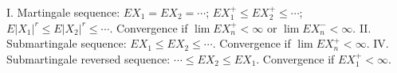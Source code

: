 I. Martingale sequence: $EX_1 = EX_2 = \cdots$; $EX_1^+ \leq EX_2^+ \leq \cdots$; $E|X_1|^r \leq E|X_2|^r \leq \cdots$. Convergence if $\lim EX_n^+ < \infty$ or $\lim EX_n^- < \infty$. II. Submartingale sequence: $EX_1 \leq EX_2 \leq \cdots$. Convergence if $\lim EX_n^+ < \infty$. IV. Submartingale reversed sequence: $\cdots \leq EX_2 \leq EX_1$. Convergence if $EX_1^+ < \infty$.
